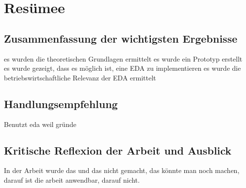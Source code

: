 \section{Resümee}
\subsection{Zusammenfassung der wichtigsten Ergebnisse}
es wurden die theoretischen Grundlagen ermittelt
es wurde ein Prototyp erstellt
es wurde gezeigt, dass es möglich ist, eine EDA zu implementieren
es wurde die betriebswirtschaftliche Relevanz der EDA ermittelt

\subsection{Handlungsempfehlung}
Benutzt eda weil gründe
\subsection{Kritische Reflexion der Arbeit und Ausblick}
In der Arbeit wurde das und das nicht gemacht,
 das könnte man noch machen,
 darauf ist die arbeit anwendbar, 
 darauf nicht.
